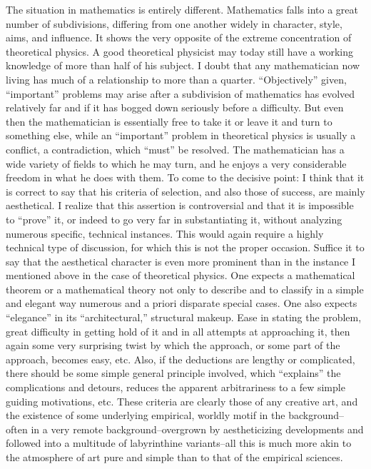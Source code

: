 \documentclass{article}
\begin{document}
The situation in mathematics is entirely different. Mathematics falls into a great number of subdivisions, differing from one another widely in character, style, aims, and influence. It shows the very opposite of the extreme concentration of theoretical physics. A good theoretical physicist may today still have a working knowledge of more than half of his subject. I doubt that any mathematician now living has much of a relationship to more than a quarter. ``Objectively'' given, ``important'' problems may arise after a subdivision of mathematics has evolved relatively far and if it has bogged down seriously before a difficulty. But even then the mathematician is essentially free to take it or leave it and turn to something else, while an ``important'' problem in theoretical physics is usually a conflict, a contradiction, which ``must'' be resolved. The mathematician has a wide variety of fields to which he may turn, and he enjoys a very considerable freedom in what he does with them. To come to the decisive point: I think that it is correct to say that his criteria of selection, and also those of success, are mainly aesthetical. I realize that this assertion is controversial and that it is impossible to ``prove'' it, or indeed to go very far in substantiating it, without analyzing numerous specific, technical instances. This would again require a highly technical type of discussion, for which this is not the proper occasion. Suffice it to say that the aesthetical character is even more prominent than in the instance I mentioned above in the case of theoretical physics. One expects a mathematical theorem or a mathematical theory not only to describe and to classify in a simple and elegant way numerous and a priori disparate special cases. One also expects ``elegance'' in its ``architectural,'' structural makeup. Ease in stating the problem, great difficulty in getting hold of it and in all attempts at approaching it, then again some very surprising twist by which the approach, or some part of the approach, becomes easy, etc. Also, if the deductions are lengthy or complicated, there should be some simple general principle involved, which ``explains'' the complications and detours, reduces the apparent arbitrariness to a few simple guiding motivations, etc. These criteria are clearly those of any creative art, and the existence of some underlying empirical, worldly motif in the background--often in a very remote background--overgrown by aestheticizing developments and followed into a multitude of labyrinthine variants--all this is much more akin to the atmosphere of art pure and simple than to that of the empirical sciences.
\end{document}

